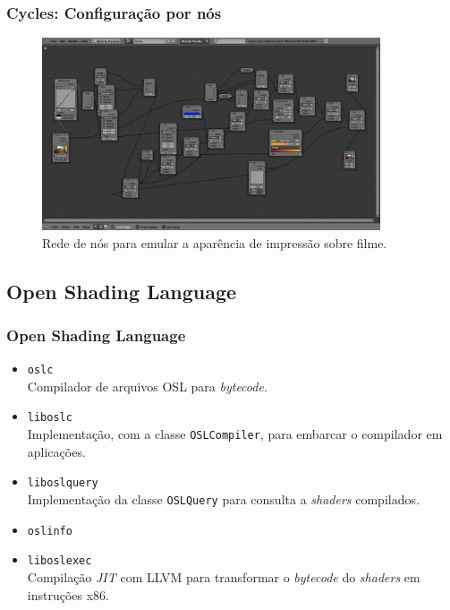 \documentclass{beamer}
\begin{document}
\begin{frame}

\frametitle{Cycles: Configuração por nós}

\begin{figure}[!htb]
\center
\includegraphics[width=10cm]{film_lookNodeNetwork}
\caption{Rede de nós para emular a aparência de impressão sobre filme.}
\end{figure}

\end{frame}

\subsection{Open Shading Language}
\begin{frame}
\frametitle{Open Shading Language}
\begin{itemize}
\item \texttt{oslc} \\ Compilador de arquivos OSL para \emph{bytecode}.

\item \texttt{liboslc} \\ Implementação, com a classe \texttt{OSLCompiler}, para embarcar o compilador em aplicações.

\item \texttt{liboslquery} \\ Implementação da classe \texttt{OSLQuery} para consulta a {\it shaders} compilados.

\item \texttt{oslinfo}

\item \texttt{liboslexec} \\ Compilação {\it JIT} com LLVM para transformar o \emph{bytecode} do {\it shaders} em instruções x86.

\end{itemize}
\end{frame}
\end{document}
